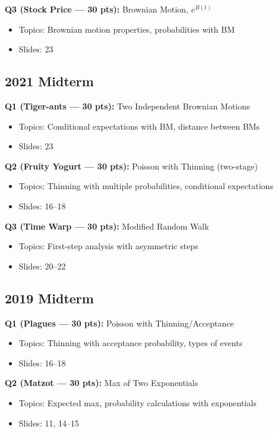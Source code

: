 \documentclass[11pt,letterpaper]{article}
\begin{document}
\textbf{Q3 (Stock Price --- 30 pts):} Brownian Motion, $e^{B(t)}$
\begin{itemize}
  \item Topics: Brownian motion properties, probabilities with BM
  \item Slides: 23
\end{itemize}

\subsection{2021 Midterm}

\textbf{Q1 (Tiger-ants --- 30 pts):} Two Independent Brownian Motions
\begin{itemize}
  \item Topics: Conditional expectations with BM, distance between BMs
  \item Slides: 23
\end{itemize}

\textbf{Q2 (Fruity Yogurt --- 30 pts):} Poisson with Thinning (two-stage)
\begin{itemize}
  \item Topics: Thinning with multiple probabilities, conditional expectations
  \item Slides: 16--18
\end{itemize}

\textbf{Q3 (Time Warp --- 30 pts):} Modified Random Walk
\begin{itemize}
  \item Topics: First-step analysis with asymmetric steps
  \item Slides: 20--22
\end{itemize}

\subsection{2019 Midterm}

\textbf{Q1 (Plagues --- 30 pts):} Poisson with Thinning/Acceptance
\begin{itemize}
  \item Topics: Thinning with acceptance probability, types of events
  \item Slides: 16--18
\end{itemize}

\textbf{Q2 (Matzot --- 30 pts):} Max of Two Exponentials
\begin{itemize}
  \item Topics: Expected max, probability calculations with exponentials
  \item Slides: 11, 14--15
\end{itemize}
\end{document}
